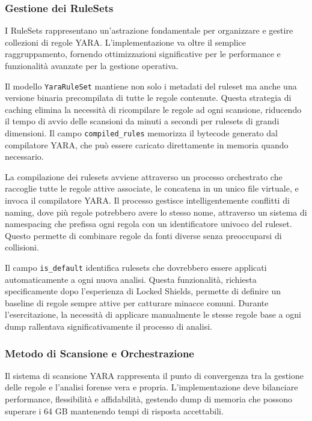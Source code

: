 \subsubsection{Gestione dei RuleSets}

I RuleSets rappresentano un'astrazione fondamentale per organizzare e gestire collezioni di regole YARA. L'implementazione va oltre il semplice raggruppamento, fornendo ottimizzazioni significative per le performance e funzionalità avanzate per la gestione operativa.

Il modello \texttt{YaraRuleSet} mantiene non solo i metadati del ruleset ma anche una versione binaria precompilata di tutte le regole contenute. Questa strategia di caching elimina la necessità di ricompilare le regole ad ogni scansione, riducendo il tempo di avvio delle scansioni da minuti a secondi per rulesets di grandi dimensioni. Il campo \texttt{compiled\_rules} memorizza il bytecode generato dal compilatore YARA, che può essere caricato direttamente in memoria quando necessario.

La compilazione dei rulesets avviene attraverso un processo orchestrato che raccoglie tutte le regole attive associate, le concatena in un unico file virtuale, e invoca il compilatore YARA. Il processo gestisce intelligentemente conflitti di naming, dove più regole potrebbero avere lo stesso nome, attraverso un sistema di namespacing che prefissa ogni regola con un identificatore univoco del ruleset. Questo permette di combinare regole da fonti diverse senza preoccuparsi di collisioni.

Il campo \texttt{is\_default} identifica rulesets che dovrebbero essere applicati automaticamente a ogni nuova analisi. Questa funzionalità, richiesta specificamente dopo l'esperienza di Locked Shields, permette di definire un baseline di regole sempre attive per catturare minacce comuni. Durante l'esercitazione, la necessità di applicare manualmente le stesse regole base a ogni dump rallentava significativamente il processo di analisi.

\subsubsection{Metodo di Scansione e Orchestrazione}

Il sistema di scansione YARA rappresenta il punto di convergenza tra la gestione delle regole e l'analisi forense vera e propria. L'implementazione deve bilanciare performance, flessibilità e affidabilità, gestendo dump di memoria che possono superare i 64 GB mantenendo tempi di risposta accettabili.

